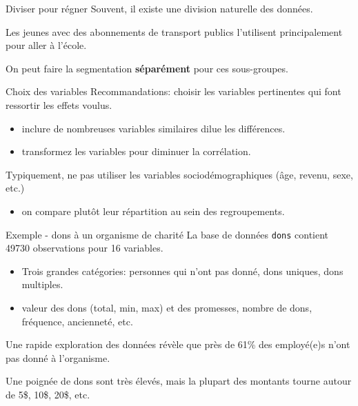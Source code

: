 \documentclass[
  ignorenonframetext,
]{beamer}
\providecommand{\tightlist}{%
  \setlength{\itemsep}{0pt}\setlength{\parskip}{0pt}}\usepackage{longtable,booktabs,array}
\begin{document}
\begin{frame}{Diviser pour régner}
\protect\hypertarget{diviser-pour-ruxe9gner}{}
Souvent, il existe une division naturelle des données.

Les jeunes avec des abonnements de transport publics l'utilisent
principalement pour aller à l'école.

On peut faire la segmentation \textbf{séparément} pour ces sous-groupes.
\end{frame}

\begin{frame}{Choix des variables}
\protect\hypertarget{choix-des-variables}{}
Recommandations: choisir les variables pertinentes qui font ressortir
les effets voulus.

\begin{itemize}
\tightlist
\item
  inclure de nombreuses variables similaires dilue les différences.
\item
  transformez les variables pour diminuer la corrélation.
\end{itemize}

Typiquement, ne pas utiliser les variables sociodémographiques (âge,
revenu, sexe, etc.)

\begin{itemize}
\tightlist
\item
  on compare plutôt leur répartition au sein des regroupements.
\end{itemize}
\end{frame}

\begin{frame}[fragile]{Exemple - dons à un organisme de charité}
\protect\hypertarget{exemple---dons-uxe0-un-organisme-de-charituxe9}{}
La base de données \texttt{dons} contient 49730 observations pour 16
variables.

\begin{itemize}
\tightlist
\item
  Trois grandes catégories: personnes qui n'ont pas donné, dons uniques,
  dons multiples.
\item
  valeur des dons (total, min, max) et des promesses, nombre de dons,
  fréquence, ancienneté, etc.
\end{itemize}

Une rapide exploration des données révèle que près de 61\% des
employé(e)s n'ont pas donné à l'organisme.

Une poignée de dons sont très élevés, mais la plupart des montants
tourne autour de 5\$, 10\$, 20\$, etc.
\end{frame}
\end{document}
